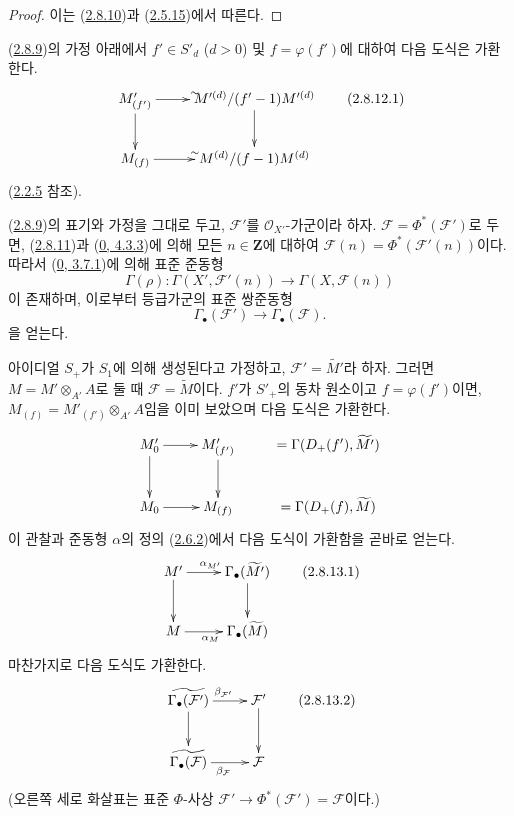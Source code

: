 \begin{proof}
이는 (\hyperref[II.2.8.10-ko]{2.8.10})과
(\hyperref[II.2.5.15-ko]{2.5.15})에서 따른다.
\end{proof}


\begin{env}[2.8.12]
\label{II.2.8.12-ko}
(\hyperref[II.2.8.9-ko]{2.8.9})의 가정 아래에서
$f'\in S'_d$ ($d>0$) 및 $f=\varphi(f')$에 대하여 다음 도식은
가환한다.
\[
\label{II.2.8.12.1-ko}
  \xymatrix{
    M'_{(f')}\ar[r]^{\sim}\ar[d]
    & M'^{(d)}/(f'-1)M'^{(d)}\ar[d]\\
    M_{(f)}\ar[r]^{\sim}
    & M^{(d)}/(f-1)M^{(d)}
  }
\tag{2.8.12.1}
\]
(\hyperref[II.2.2.5-ko]{2.2.5} 참조).
\end{env}

\begin{env}[2.8.13]
\label{II.2.8.13-ko}
(\hyperref[II.2.8.9-ko]{2.8.9})의 표기와 가정을 그대로 두고,
$\mathcal{F}'$를 $\mathcal{O}_{X'}$-가군이라 하자.
$\mathcal{F}=\Phi^*(\mathcal{F}')$로 두면,
(\hyperref[II.2.8.11-ko]{2.8.11})과
(\hyperref[0.4.3.3-ko]{0, 4.3.3})에 의해 모든 $n\in\mathbf{Z}$에
대하여 $\mathcal{F}(n)=\Phi^*(\mathcal{F}'(n))$이다. 따라서
(\hyperref[0.3.7.1-ko]{0, 3.7.1})에 의해 표준 준동형
\[
  \Gamma(\rho):\Gamma(X',\mathcal{F}'(n))
  \longrightarrow\Gamma(X,\mathcal{F}(n))
\]
이 존재하며, 이로부터 등급가군의 표준 쌍준동형
\[
  \Gamma_\bullet(\mathcal{F}')\longrightarrow
  \Gamma_\bullet(\mathcal{F}).
\]
을 얻는다.

아이디얼 $S_+$가 $S_1$에 의해 생성된다고 가정하고,
$\mathcal{F}'=\widetilde{M'}$라 하자. 그러면
$M=M'\otimes_{A'}A$로 둘 때 $\mathcal{F}=\widetilde{M}$이다.
$f'$가 $S'_+$의 동차 원소이고 $f=\varphi(f')$이면,
$M_{(f)}=M'_{(f')}\otimes_{A'}A$임을 이미 보았으며 다음 도식은
가환한다.
\[
  \xymatrix{
    M'_0\ar[r]\ar[d]
    & M'_{(f')}\ar[d]
    & =\Gamma(D_+(f'),\widetilde{M'})\\
    M_0\ar[r]
    & M_{(f)}
    & =\Gamma(D_+(f),\widetilde{M})
  }
\]
이 관찰과 준동형 $\alpha$의 정의
(\hyperref[II.2.6.2-ko]{2.6.2})에서 다음 도식이 가환함을 곧바로
얻는다.
\[
\label{II.2.8.13.1-ko}
  \xymatrix{
    M'\ar[r]^{\alpha_{M'}}\ar[d]
    & \Gamma_\bullet(\widetilde{M'})\ar[d]\\
    M\ar[r]_{\alpha_M}
    & \Gamma_\bullet(\widetilde{M})
  }
\tag{2.8.13.1}
\]
마찬가지로 다음 도식도 가환한다.
\[
\label{II.2.8.13.2-ko}
  \xymatrix{
    \widetilde{\Gamma_\bullet(\mathcal{F}')}\ar[r]^{\beta_{\mathcal{F}'}}
      \ar[d]
    & \mathcal{F}'\ar[d]\\
    \widetilde{\Gamma_\bullet(\mathcal{F})}\ar[r]_{\beta_{\mathcal{F}}}
    & \mathcal{F}
  }
\tag{2.8.13.2}
\]
(오른쪽 세로 화살표는 표준 $\Phi$-사상
$\mathcal{F}'\to\Phi^*(\mathcal{F}')=\mathcal{F}$이다.)
\end{env}

